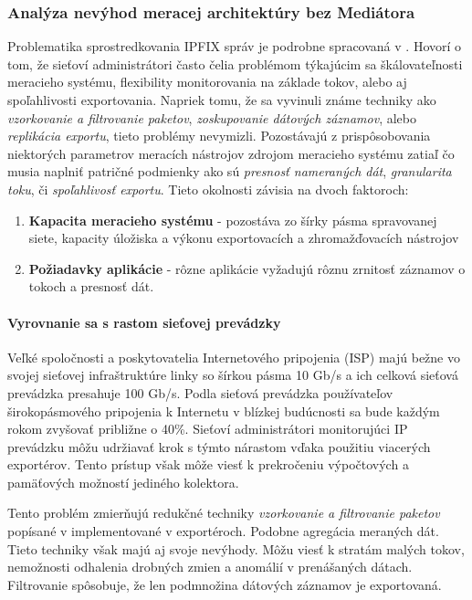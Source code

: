 \subsubsection{Anal\'yza nev\'yhod meracej architekt\'ury bez Medi\'atora}


Problematika sprostredkovania IPFIX správ je podrobne spracovaná v \citep{rfc5982}. 
Hovorí o tom, že sieťoví administrátori často čelia problémom týkajúcim sa škálovateľnosti meracieho 
systému, flexibility monitorovania na základe tokov, alebo aj spoľahlivosti exportovania.
Napriek tomu, že sa vyvinuli známe techniky ako \emph{vzorkovanie a filtrovanie  paketov}, \emph{zoskupovanie 
dátových záznamov}, alebo \emph{replikácia exportu}, tieto problémy nevymizli.
Pozostávajú z prispôsobovania niektorých parametrov meracích nástrojov zdrojom meracieho 
systému zatiaľ čo musia naplniť patričné podmienky ako sú \emph{presnosť nameraných dát}, \emph{granularita 
toku}, či \emph{spoľahlivosť exportu}. Tieto okolnosti závisia na dvoch faktoroch:
\begin{enumerate}
 \item \textbf{Kapacita  meracieho systému} - pozostáva zo šírky pásma  spravovanej siete, kapacity 
 úložiska a výkonu exportovacích a zhromažďovacích nástrojov
 
 \item \textbf{Požiadavky aplikácie} - rôzne aplikácie vyžadujú rôznu zrnitosť záznamov o tokoch a presnosť dát.
\end{enumerate}



\paragraph{Vyrovnanie sa s rastom sieťovej prev\'adzky}

Veľké spoločnosti a poskytovatelia Internetového pripojenia (ISP) majú bežne vo svojej sieťovej 
infraštruktúre linky so šírkou pásma 10 Gb/s a ich celková sieťová prevádzka presahuje 100 Gb/s. 
Podla \citep{trafgrw} sieťová prevádzka používateľov širokopásmového pripojenia k
Internetu v blízkej budúcnosti sa bude každým rokom zvyšovať približne o 40\%. Sieťoví administrátori
monitorujúci IP prevádzku môžu udržiavať krok s týmto nárastom vďaka použitiu viacerých exportérov. 
Tento prístup však môže viesť k prekročeniu výpočtových a pamäťových možností jediného kolektora.

Tento problém zmierňujú redukčné techniky \emph{vzorkovanie a filtrovanie paketov} popísané v \citep{rfc5475}
implementované v exportéroch. Podobne agregácia meraných dát. Tieto techniky však majú aj svoje nevýhody. 
Môžu viesť k stratám malých tokov, nemožnosti odhalenia drobných zmien a anomálií v prenášaných dátach. 
Filtrovanie spôsobuje, že len podmnožina dátových záznamov je exportovaná.

